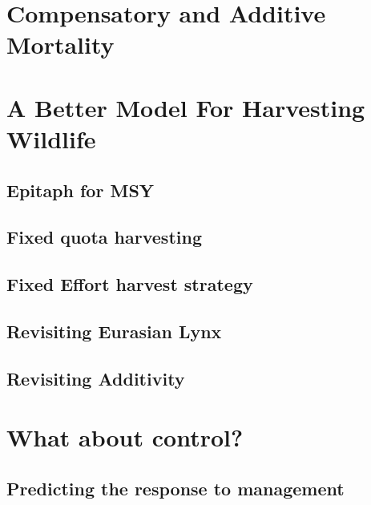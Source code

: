 \documentclass[]{book}
\theoremstyle{definition}
\theoremstyle{definition}
\theoremstyle{definition}
\theoremstyle{remark}
\begin{document}
\hypertarget{standard-model}{%
\section{Compensatory and Additive Mortality}\label{standard-model}}

\hypertarget{better-model}{%
\section{A Better Model For Harvesting Wildlife}\label{better-model}}

\hypertarget{epitaph-for-msy}{%
\subsection*{Epitaph for MSY}\label{epitaph-for-msy}}

\hypertarget{fixed-quota-harvesting}{%
\subsection{Fixed quota harvesting}\label{fixed-quota-harvesting}}

\hypertarget{fixed-effort-harvest-strategy}{%
\subsection{Fixed Effort harvest
strategy}\label{fixed-effort-harvest-strategy}}

\hypertarget{revisiting-eurasian-lynx}{%
\subsection{Revisiting Eurasian Lynx}\label{revisiting-eurasian-lynx}}

\hypertarget{revisiting-additivity}{%
\subsection{Revisiting Additivity}\label{revisiting-additivity}}

\hypertarget{what-about-control}{%
\section{What about control?}\label{what-about-control}}

\hypertarget{predicting-the-response-to-management}{%
\subsection{Predicting the response to
management}\label{predicting-the-response-to-management}}
\end{document}
